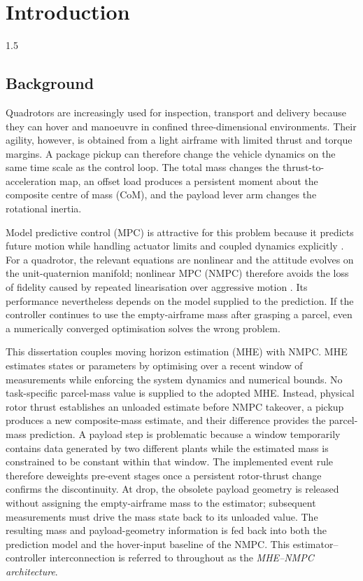 \chapter{Introduction}
\label{ch:introduction}
\begin{spacing}{1.5}
\setlength{\parskip}{0.22in}

\section{Background}

Quadrotors are increasingly used for inspection, transport and delivery because they can hover and manoeuvre in confined three-dimensional environments. Their agility, however, is obtained from a light airframe with limited thrust and torque margins. A package pickup can therefore change the vehicle dynamics on the same time scale as the control loop. The total mass changes the thrust-to-acceleration map, an offset load produces a persistent moment about the composite centre of mass (CoM), and the payload lever arm changes the rotational inertia.

Model predictive control (MPC) is attractive for this problem because it predicts future motion while handling actuator limits and coupled dynamics explicitly \cite{rawlings2017mpc,mayne2014mpc}. For a quadrotor, the relevant equations are nonlinear and the attitude evolves on the unit-quaternion manifold; nonlinear MPC (NMPC) therefore avoids the loss of fidelity caused by repeated linearisation over aggressive motion \cite{grune2017nmpc,kamel2017linear}. Its performance nevertheless depends on the model supplied to the prediction. If the controller continues to use the empty-airframe mass after grasping a parcel, even a numerically converged optimisation solves the wrong problem.

This dissertation couples moving horizon estimation (MHE) with NMPC. MHE estimates states or parameters by optimising over a recent window of measurements while enforcing the system dynamics and numerical bounds. No task-specific parcel-mass value is supplied to the adopted MHE. Instead, physical rotor thrust establishes an unloaded estimate before NMPC takeover, a pickup produces a new composite-mass estimate, and their difference provides the parcel-mass prediction. A payload step is problematic because a window temporarily contains data generated by two different plants while the estimated mass is constrained to be constant within that window. The implemented event rule therefore deweights pre-event stages once a persistent rotor-thrust change confirms the discontinuity. At drop, the obsolete payload geometry is released without assigning the empty-airframe mass to the estimator; subsequent measurements must drive the mass state back to its unloaded value. The resulting mass and payload-geometry information is fed back into both the prediction model and the hover-input baseline of the NMPC. This estimator--controller interconnection is referred to throughout as the \emph{MHE--NMPC architecture}.


\end{spacing}
